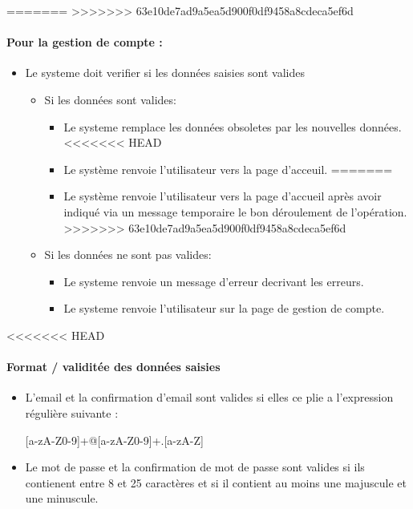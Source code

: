 \documentclass{article}
\begin{document}
\begin{itemize}
\begin{itemize}
=======
>>>>>>> 63e10de7ad9a5ea5d900f0df9458a8cdeca5ef6d

\paragraph{Pour la gestion de compte : }
\begin{itemize}
\item Le systeme doit verifier si les données saisies sont valides
	\begin{itemize}
	\item Si les données sont valides:
		\begin{itemize}
		\item Le systeme remplace les données obsoletes par
                  les nouvelles données.
<<<<<<< HEAD
                \item Le système renvoie l'utilisateur vers la page d'acceuil.
=======
                \item Le système renvoie l'utilisateur vers la page d'accueil
                 après avoir indiqué via un message temporaire le bon déroulement de l'opération.
>>>>>>> 63e10de7ad9a5ea5d900f0df9458a8cdeca5ef6d
		\end{itemize}
		\item Si les données ne sont pas valides:
		\begin{itemize}
		\item Le systeme renvoie un message d'erreur decrivant
                  les erreurs.
                \item Le systeme renvoie l'utilisateur sur la page de
                  gestion de compte.
		\end{itemize}
	\end{itemize}
\end{itemize}
<<<<<<< HEAD

\paragraph{Format / validitée des données saisies}
\begin{itemize}
\item L'email  et la confirmation d'email sont valides si elles ce plie a l'expression régulière
  suivante :

[a-zA-Z0-9]+@[a-zA-Z0-9]+.[a-zA-Z]

\item Le mot de passe et la confirmation de mot de passe sont valides si ils contienent entre 8 et 25
  caractères et si il contient au moins une majuscule et une minuscule.


\end{itemize}
\end{itemize}
\end{itemize}
\end{document}
